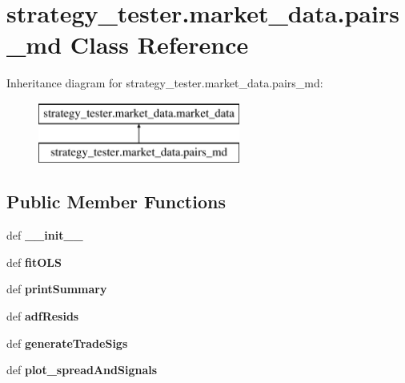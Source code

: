 \hypertarget{classstrategy__tester_1_1market__data_1_1pairs__md}{\section{strategy\-\_\-tester.\-market\-\_\-data.\-pairs\-\_\-md \-Class \-Reference}
\label{classstrategy__tester_1_1market__data_1_1pairs__md}
}
\-Inheritance diagram for strategy\-\_\-tester.\-market\-\_\-data.\-pairs\-\_\-md\-:\begin{figure}[H]
\begin{center}
\leavevmode
\includegraphics[height=2.000000cm]{classstrategy__tester_1_1market__data_1_1pairs__md}
\end{center}
\end{figure}
\subsection*{\-Public \-Member \-Functions}
\begin{DoxyCompactItemize}
\item 
\hypertarget{classstrategy__tester_1_1market__data_1_1pairs__md_a59735cc87a4b4665c5e31a84cc5e365a}{def {\bfseries \-\_\-\-\_\-init\-\_\-\-\_\-}}\label{classstrategy__tester_1_1market__data_1_1pairs__md_a59735cc87a4b4665c5e31a84cc5e365a}

\item 
\hypertarget{classstrategy__tester_1_1market__data_1_1pairs__md_a4591fffb15e8d3834272d2f8d2523894}{def {\bfseries fit\-O\-L\-S}}\label{classstrategy__tester_1_1market__data_1_1pairs__md_a4591fffb15e8d3834272d2f8d2523894}

\item 
\hypertarget{classstrategy__tester_1_1market__data_1_1pairs__md_af17912421ae58dcaac2355155fd0b393}{def {\bfseries print\-Summary}}\label{classstrategy__tester_1_1market__data_1_1pairs__md_af17912421ae58dcaac2355155fd0b393}

\item 
\hypertarget{classstrategy__tester_1_1market__data_1_1pairs__md_a06f16aa633f2e79bb482dfc4f072e653}{def {\bfseries adf\-Resids}}\label{classstrategy__tester_1_1market__data_1_1pairs__md_a06f16aa633f2e79bb482dfc4f072e653}

\item 
\hypertarget{classstrategy__tester_1_1market__data_1_1pairs__md_ae496dc6a76a8cd0393e1a360c4a72fb1}{def {\bfseries generate\-Trade\-Sigs}}\label{classstrategy__tester_1_1market__data_1_1pairs__md_ae496dc6a76a8cd0393e1a360c4a72fb1}

\item 
\hypertarget{classstrategy__tester_1_1market__data_1_1pairs__md_a26949bef9a88c07a89690a988aa77846}{def {\bfseries plot\-\_\-spread\-And\-Signals}}\label{classstrategy__tester_1_1market__data_1_1pairs__md_a26949bef9a88c07a89690a988aa77846}

\end{DoxyCompactItemize}

